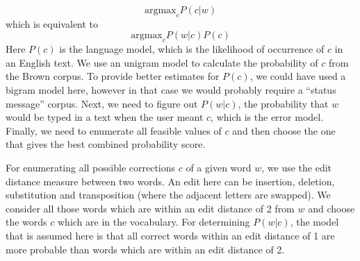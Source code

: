 \begin{itemize}
\begin{equation*}
 \mbox{argmax}_c P(c|w)
\end{equation*}
which is equivalent to 
\begin{equation*}
\mbox{argmax}_c P(w|c) P(c)
\end{equation*}
Here $P(c)$ is the language model, which is the likelihood of occurrence of $c$ in an English text. We use an unigram model to calculate the probability of $c$ from the Brown corpus. To provide better estimates for $P(c)$, we could have used a bigram model here, however in that case we would probably require a ``status message'' corpus. Next, we need to figure out $P(w|c)$, the probability that $w$ would be typed in a text when the user meant $c$, which is the error model. Finally, we need to enumerate all feasible values of $c$ and then choose the one that gives the best combined probability score. 

For enumerating all possible corrections $c$ of a given word $w$, we use the edit distance measure between two words. An edit here can be insertion, deletion, substitution and transposition (where the adjacent letters are swapped). We consider all those words which are within an edit distance of 2 from $w$ and choose the words $c$ which are in the vocabulary. For determining $P(w|c)$, the model that is assumed here is that all correct words within an edit distance of 1 are more probable than words which are within an edit distance of 2.


\end{itemize}















